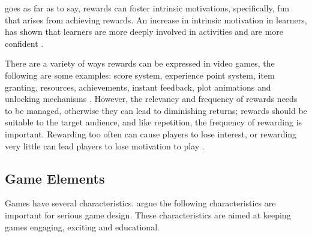 \documentclass[a4paper,11.5pt]{report}
\numberwithin{figure}{section}
\numberwithin{table}{section}
\numberwithin{equation}{section}
\numberwithin{equation}{section}
\begin{document}
\citet{wang2011} goes as far as to say, rewards can foster intrinsic motivations, specifically, fun that arises from achieving rewards. An increase in intrinsic motivation in learners, has shown that learners are more deeply involved in activities and are more confident \citep{Cordova1996}. 

There are a variety of ways rewards can be expressed in video games, the following are some examples: score system, experience point system, item granting, resources, achievements, instant feedback, plot animations and unlocking mechanisms \citep{wang2011}. However, the relevancy and frequency of rewards needs to be managed, otherwise they can lead to diminishing returns; rewards should be suitable to the target audience, and like repetition, the frequency of rewarding is important. Rewarding too often can cause players to lose interest, or rewarding very little can lead players to lose motivation to play \citep{roungas2015}.


\subsection{Game Elements} %

Games have several characteristics. \citet{roungas2015} argue the following characteristics are important for serious game design. These characteristics are aimed at keeping games engaging, exciting and educational.
\end{document}
